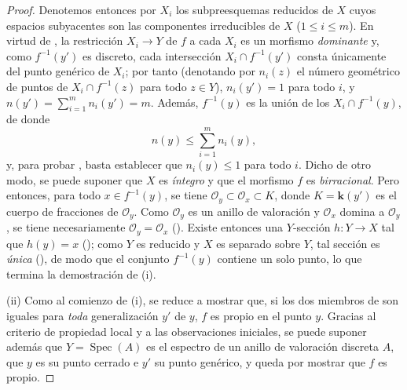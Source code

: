 \begin{proof}
Denotemos entonces por $X_i$ los subpreesquemas reducidos de $X$ cuyos espacios subyacentes son las componentes irreducibles de $X$ ($1\leqslant i\leqslant m$).
En virtud de , la restricción $X_i\to Y$ de $f$ a cada $X_i$ es un morfismo \emph{dominante} y, como $f^{-1}(y')$ es discreto, cada intersección $X_i\cap f^{-1}(y')$ consta únicamente del punto genérico de $X_i$; por tanto (denotando por $n_i(z)$ el número geométrico de puntos de $X_i\cap f^{-1}(z)$ para todo $z\in Y$), $n_i(y')=1$ para todo $i$, y $n(y')=\sum_{i=1}^{m}n_i(y')=m$.
Además, $f^{-1}(y)$ es la unión de los $X_i\cap f^{-1}(y)$, de donde
\begin{equation}
\tag{15.5.2.3}
\label{IV.15.5.2.3-fr}
  n(y)\leqslant\sum_{i=1}^{m}n_i(y),
\end{equation}
y, para probar , basta establecer que $n_i(y)\leqslant 1$ para todo $i$.
Dicho de otro modo, se puede suponer que $X$ es \emph{íntegro} y que el morfismo $f$ es \emph{birracional}.
Pero entonces, para todo $x\in f^{-1}(y)$, se tiene $\mathcal O_y\subset\mathcal O_x\subset K$, donde $K=\boldsymbol{k}(y')$ es el cuerpo de fracciones de $\mathcal O_y$.
Como $\mathcal O_y$ es un anillo de valoración y $\mathcal O_x$ domina a $\mathcal O_y$, se tiene necesariamente $\mathcal O_y=\mathcal O_x$ ().
Existe entonces una $Y$-sección $h:Y\to X$ tal que $h(y)=x$ (); como $Y$ es reducido y $X$ es separado sobre $Y$, tal sección es \emph{única} (), de modo que el conjunto $f^{-1}(y)$ contiene un solo punto, lo que termina la demostración de (i).

(ii)
Como al comienzo de (i), se reduce a mostrar que, si los dos miembros de  son iguales para \emph{toda} generalización $y'$ de $y$, $f$ es propio en el punto $y$.
Gracias al criterio de propiedad local  y a las observaciones iniciales, se puede suponer además que $Y=\operatorname{Spec}(A)$ es el espectro de un anillo de valoración discreta $A$, que $y$ es su punto cerrado e $y'$ su punto genérico, y queda por mostrar que $f$ es propio.


\end{proof}
